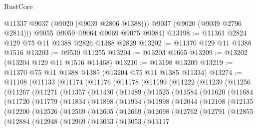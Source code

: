 \begin{lexlean}{RustCore}
\begin{coremodule}
          @11337
          @9037
          (@9020 (@9039 @2806 @1388)))
        @9037
        (@9020 (@9039 @2796 @2814)))
      @9055
      @9059
      @9064
      @9069
      @9075
      @9084)
@13198 := @11361 @2824 @129 @75 @11 @1388 @2826 @1388 @2829
@13202 := @11370 @129 @11 @1388 @1516
@13203 := @9530 @11255
@13204 := @13203 @1665
@13209 := @13202 (@13204 @129 @11 @1516 @11468)
@13210 := @13198 @13209
@13219 := @11370 @75 @11 @1388 @1385 (@13204 @75 @11 @1385 @11334)
@13274 := @11108
    (@11133
      (@11174
        (@11176
          (@11178
            (@11199
              (@11222
                (@11239
                  (@11256
                    (@11267
                      (@11271
                        (@11357
                          (@11430
                            (@11489
                              (@11525
                                (@11584
                                  (@11620
                                    (@11684
                                      (@11720
                                        (@11779
                                          (@11834
                                            (@11898
                                              (@11934
                                                (@11998
                                                  (@12044
                                                    (@12108
                                                      (@12135
                                                        (@12200
                                                          (@12526
                                                            (@12569
                                                              (@12605
                                                                (@12669
                                                                  (@12698
                                                                    (@12762
                                                                      (@12791
                                                                        (@12855
                                                                          (@12884
                                                                            (@12948
                                                                              (@12969
                                                                                (@13033
                                                                                  (@13053
                                                                                    (@13117

\end{coremodule}
\end{lexlean}
